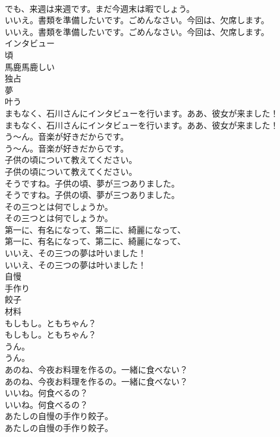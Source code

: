 \documentclass[8pt]{extreport}
\begin{document}
\begin{CJK}{UTF8}{min}
\\	でも、来週は来週です。まだ今週末は暇でしょう。 
\\	いいえ。書類を準備したいです。ごめんなさい。今回は、欠席します。	
\\	いいえ。書類を準備したいです。ごめんなさい。今回は、欠席します。 
\\	インタビュー
\\	頃
\\	馬鹿馬鹿しい
\\	独占
\\	夢
\\	叶う
\\	まもなく、石川さんにインタビューを行います。ああ、彼女が来ました！	
\\	まもなく、石川さんにインタビューを行います。ああ、彼女が来ました！ 
\\	う〜ん。音楽が好きだからです。	
\\	う〜ん。音楽が好きだからです。 
\\	子供の頃について教えてください。	
\\	子供の頃について教えてください。 
\\	そうですね。子供の頃、夢が三つありました。	
\\	そうですね。子供の頃、夢が三つありました。 
\\	その三つとは何でしょうか。	
\\	その三つとは何でしょうか。 
\\	第一に、有名になって、第二に、綺麗になって、	
\\	第一に、有名になって、第二に、綺麗になって、 
\\	いいえ、その三つの夢は叶いました！	
\\	いいえ、その三つの夢は叶いました！ 
\\	自慢
\\	手作り
\\	餃子
\\	材料
\\	もしもし。ともちゃん？	
\\	もしもし。ともちゃん？ 
\\	うん。	
\\	うん。 
\\	あのね、今夜お料理を作るの。一緒に食べない？	
\\	あのね、今夜お料理を作るの。一緒に食べない？ 
\\	いいね。何食べるの？	
\\	いいね。何食べるの？ 
\\	あたしの自慢の手作り餃子。	
\\	あたしの自慢の手作り餃子。 

\end{CJK}
\end{document}
